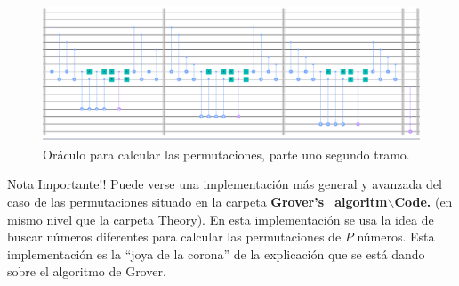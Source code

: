\documentclass[a4paper,11pt]{article} %
\numberwithin{equation}{section}
\begin{document}
	\begin{figure}[H]
	\centering 
	\includegraphics[width=1\linewidth]{Figuras/Fig_permitaciones_oracle_2.png}
	\caption{Oráculo para calcular las permutaciones, parte uno segundo tramo.}
	\label{Fig_permitaciones_oracle_2.png}
	\end{figure}

\begin{mybox_red}{Nota Importante!!}
Puede verse una implementación más general y avanzada del caso de las permutaciones situado en la carpeta \textbf{Grover's\_algoritm$\backslash$Code.} (en mismo nivel que la carpeta Theory). En esta implementación se usa la idea de buscar números diferentes para calcular las permutaciones de $P$ números. Esta implementación es la ``joya de la corona'' de la explicación que se está dando sobre el algoritmo de Grover.
\end{mybox_red}





















\nocite{*}


\end{document}
